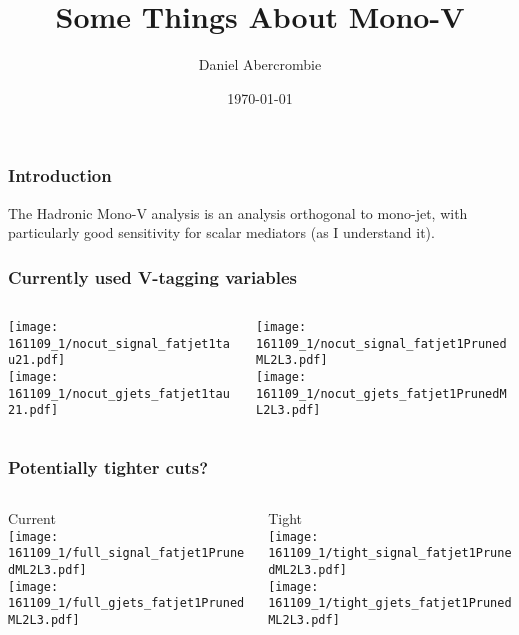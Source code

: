 \documentclass{beamer}
\author[D. Abercrombie]{
  Daniel Abercrombie
}
\title{\bf \sffamily Some Things About Mono-V}
\date{\today}
\begin{document}
\begin{frame}[nonumbering]
  \titlepage
\end{frame}

\begin{frame}
  \frametitle{Introduction}

  The Hadronic Mono-V analysis is an analysis orthogonal to mono-jet,
  with particularly good sensitivity for scalar mediators
  (as I understand it).

\end{frame}

\begin{frame}
  \frametitle{Currently used V-tagging variables}

  \begin{columns}
    \begin{column}{0.5\linewidth}
      \centering
      \texttt{[image: 161109\_1/nocut\_signal\_fatjet1tau21.pdf]} \\
      \texttt{[image: 161109\_1/nocut\_gjets\_fatjet1tau21.pdf]}
    \end{column}
    \begin{column}{0.5\linewidth}
      \centering
      \texttt{[image: 161109\_1/nocut\_signal\_fatjet1PrunedML2L3.pdf]} \\
      \texttt{[image: 161109\_1/nocut\_gjets\_fatjet1PrunedML2L3.pdf]}
    \end{column}
  \end{columns}

\end{frame}

\begin{frame}
  \frametitle{Potentially tighter cuts?}

  \begin{columns}
    \begin{column}{0.5\linewidth}
      \centering
      Current \\
      \texttt{[image: 161109\_1/full\_signal\_fatjet1PrunedML2L3.pdf]} \\
      \texttt{[image: 161109\_1/full\_gjets\_fatjet1PrunedML2L3.pdf]}
    \end{column}
    \begin{column}{0.5\linewidth}
      \centering
      Tight \\
      \texttt{[image: 161109\_1/tight\_signal\_fatjet1PrunedML2L3.pdf]} \\
      \texttt{[image: 161109\_1/tight\_gjets\_fatjet1PrunedML2L3.pdf]}
    \end{column}
  \end{columns}

\end{frame}
\end{document}
